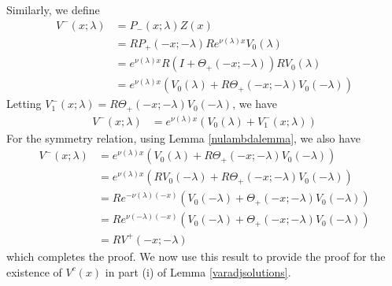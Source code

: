 \documentclass[thesis.tex]{subfiles}
\begin{document}
Similarly, we define 
\begin{align*}
V^-(x; \lambda) &= P_-(x; \lambda) Z(x) \\
&= RP_+(-x; -\lambda)R e^{\nu(\lambda)x} V_0(\lambda) \\
&= e^{\nu(\lambda)x} R(I + \Theta_+(-x; -\lambda))R V_0(\lambda) \\
&= e^{\nu(\lambda)x}( V_0(\lambda) + R\Theta_+(-x; -\lambda) V_0(-\lambda) )
\end{align*}
Letting $V_1^-(x; \lambda) = R\Theta_+(-x; -\lambda) V_0(-\lambda)$, we have
\begin{align*}
V^-(x; \lambda) &= e^{\nu(\lambda)x}( V_0(\lambda) + V_1^-(x; \lambda))
\end{align*}
For the symmetry relation, using Lemma \ref{nulambdalemma}, we also have
\begin{align*}
V^-(x; \lambda) &= e^{\nu(\lambda)x}( V_0(\lambda) + R\Theta_+(-x; -\lambda) V_0(-\lambda) ) \\
&= e^{\nu(\lambda)x}( R V_0(-\lambda) + R\Theta_+(-x; -\lambda) V_0(-\lambda) ) \\
&= R e^{-\nu(\lambda)(-x)}( V_0(-\lambda) + \Theta_+(-x; -\lambda) V_0(-\lambda) ) \\
&= R e^{\nu(-\lambda)(-x)}( V_0(-\lambda) + \Theta_+(-x; -\lambda) V_0(-\lambda) ) \\
&= R V^+(-x; -\lambda)
\end{align*}
which completes the proof. We now use this result to provide the proof for the existence of $V^c(x)$ in part (i) of Lemma \ref{varadjsolutions}.
 
\end{document}
